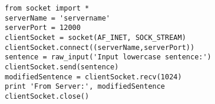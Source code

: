 \documentclass[varwidth=31em,crop]{standalone}
\begin{document}
\begin{verbatim}
from socket import *
serverName = 'servername'
serverPort = 12000
clientSocket = socket(AF_INET, SOCK_STREAM)
clientSocket.connect((serverName,serverPort))
sentence = raw_input('Input lowercase sentence:')
clientSocket.send(sentence)
modifiedSentence = clientSocket.recv(1024)
print 'From Server:', modifiedSentence
clientSocket.close()
\end{verbatim}
\end{document}
